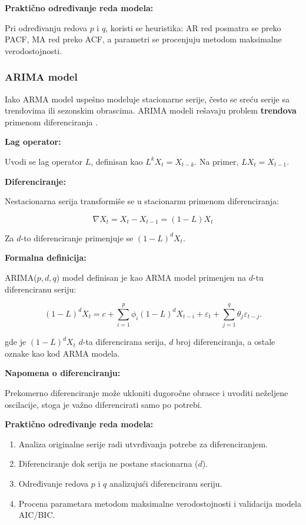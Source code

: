 \documentclass[12pt]{article}
\begin{document}
\textbf{Praktično određivanje reda modela:}

Pri određivanju redova $p$ i $q$, koristi se heuristika: AR red posmatra se preko PACF, MA red preko ACF, a parametri se procenjuju metodom maksimalne verodostojnosti.

\subsubsection{ARIMA model}

Iako ARMA model uspešno modeluje stacionarne serije, često se sreću serije sa trendovima ili sezonskim obrascima. ARIMA modeli rešavaju problem \textbf{trendova} primenom diferenciranja \cite{box1970, hamilton1994}.

\textbf{Lag operator:}

Uvodi se lag operator $L$, definisan kao $L^k X_t = X_{t-k}$. Na primer, $L X_t = X_{t-1}$.

\textbf{Diferenciranje:}

Nestacionarna serija transformiše se u stacionarnu primenom diferenciranja:

\begin{equation}
\nabla X_t = X_t - X_{t-1} = (1 - L) X_t
\end{equation}

Za $d$-to diferenciranje primenjuje se $(1 - L)^d X_t$.

\textbf{Formalna definicija:}

ARIMA($p,d,q$) model definisan je kao ARMA model primenjen na $d$-tu diferenciranu seriju:

\begin{equation}
(1 - L)^d X_t = c + \sum_{i=1}^{p} \phi_i (1 - L)^d X_{t-i}
           + \varepsilon_t
           + \sum_{j=1}^{q} \theta_j \varepsilon_{t-j}.
\end{equation}

gde je $(1 - L)^d X_t$ $d$-ta diferencirana serija, $d$ broj diferenciranja, a ostale oznake kao kod ARMA modela.

\textbf{Napomena o diferenciranju:}

Prekomerno diferenciranje može ukloniti dugoročne obrasce i uvoditi neželjene oscilacije, stoga je važno diferencirati samo po potrebi.

\textbf{Praktično određivanje reda modela:}

\begin{enumerate}
    \item Analiza originalne serije radi utvrđivanja potrebe za diferenciranjem.
    \item Diferenciranje dok serija ne postane stacionarna ($d$).
    \item Određivanje redova $p$ i $q$ analizujući diferenciranu seriju.
    \item Procena parametara metodom maksimalne verodostojnosti i validacija modela AIC/BIC.
\end{enumerate}
\end{document}
